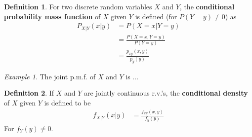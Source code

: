 \documentclass{article}
\theoremstyle{definition}
\newtheorem{definition}{Definition}[section]
\theoremstyle{remark}
\theoremstyle{example}
\newtheorem*{example}{Example}
\begin{document}
	\begin{definition}
		For two discrete random variables $X$ and $Y$, the \textbf{conditional probability mass function} of $X$ given $Y$ is defined (for $P(Y=y) \neq 0$) as \begin{align*}
			P_{X|Y}(x|y)&=P(X=x|Y=y)\\
			&=\frac{P(X=x,Y=y)}{P(Y=y)}\\
			&=\frac{p_{xy}(x,y)}{p_y(y)}
		\end{align*}
	\end{definition}

	\begin{example}
		The joint p.m.f. of $X$ and $Y$ is ...
	\end{example}

	\begin{definition}
		If $X$ and $Y$ are jointly continuous r.v.'s, the \textbf{conditional density} of $X$ given $Y$ is defined to be \begin{align*}
			f_{X|Y}(x|y)&=\frac{f_{xy}(x,y)}{f_y(y)}
		\end{align*}
		For $f_Y(y)\neq 0$.
	\end{definition}
\end{document}
